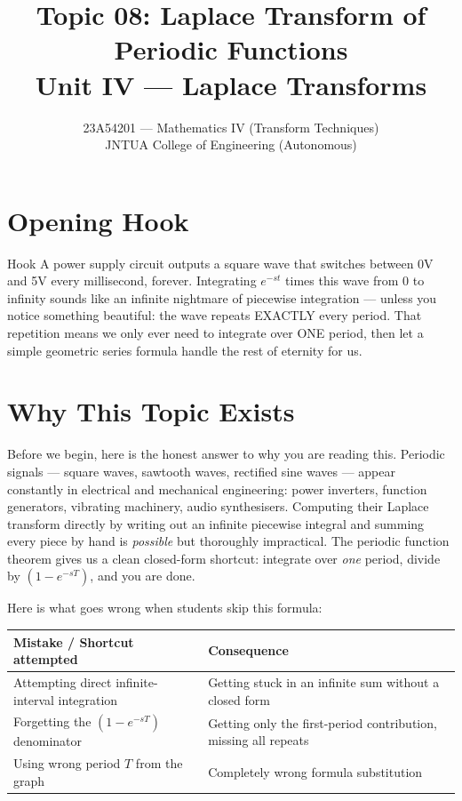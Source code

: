 \documentclass[12pt,a4paper]{article}
\title{Topic 08: Laplace Transform of Periodic Functions \\
  \large Unit IV --- Laplace Transforms}
\author{23A54201 --- Mathematics IV (Transform Techniques) \\
  JNTUA College of Engineering (Autonomous)}
\date{}
\begin{document}
\maketitle
\tableofcontents
\newpage

\section{Opening Hook}
\begin{curiositybox}{Hook}
A power supply circuit outputs a square wave that switches between 0V and 5V
every millisecond, forever. Integrating $e^{-st}$ times this wave from 0 to
infinity sounds like an infinite nightmare of piecewise integration --- unless
you notice something beautiful: the wave repeats EXACTLY every period. That
repetition means we only ever need to integrate over ONE period, then let a
simple geometric series formula handle the rest of eternity for us.
\end{curiositybox}

\section{Why This Topic Exists}

Before we begin, here is the honest answer to why you are reading this.
Periodic signals --- square waves, sawtooth waves, rectified sine waves ---
appear constantly in electrical and mechanical engineering: power inverters,
function generators, vibrating machinery, audio synthesisers. Computing their
Laplace transform directly by writing out an infinite piecewise integral and
summing every piece by hand is \emph{possible} but thoroughly impractical.
The periodic function theorem gives us a clean closed-form shortcut: integrate
over \emph{one} period, divide by $(1 - e^{-sT})$, and you are done.

Here is what goes wrong when students skip this formula:

\begin{center}
\begin{tabular}{@{}ll@{}}
\toprule
\textbf{Mistake / Shortcut attempted} & \textbf{Consequence} \\
\midrule
Attempting direct infinite-interval integration & Getting stuck in an infinite sum without a closed form \\
Forgetting the $(1-e^{-sT})$ denominator & Getting only the first-period contribution, missing all repeats \\
Using wrong period $T$ from the graph & Completely wrong formula substitution \\
\bottomrule
\end{tabular}
\end{center}
\end{document}
